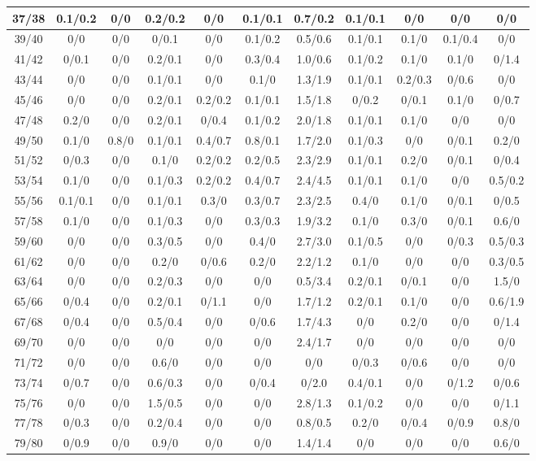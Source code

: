 \begin{table*}[htb]
\begin{tabular}{|c| c c c c c c c c c c |}
37/38&0.1/0.2& 0/0& 0.2/0.2& 0/0& 0.1/0.1& 0.7/0.2& 0.1/0.1& 0/0& 0/0& 0/0\\\hline
39/40&0/0& 0/0& 0/0.1& 0/0& 0.1/0.2& 0.5/0.6& 0.1/0.1& 0.1/0& 0.1/0.4& 0/0\\\hline
41/42&0/0.1& 0/0& 0.2/0.1& 0/0& 0.3/0.4& 1.0/0.6& 0.1/0.2& 0.1/0& 0.1/0& 0/1.4\\\hline
43/44&0/0& 0/0& 0.1/0.1& 0/0& 0.1/0& 1.3/1.9& 0.1/0.1& 0.2/0.3& 0/0.6& 0/0\\\hline
45/46&0/0& 0/0& 0.2/0.1& 0.2/0.2& 0.1/0.1& 1.5/1.8& 0/0.2& 0/0.1& 0.1/0& 0/0.7\\\hline
47/48&0.2/0& 0/0& 0.2/0.1& 0/0.4& 0.1/0.2& 2.0/1.8& 0.1/0.1& 0.1/0& 0/0& 0/0\\\hline
49/50&0.1/0& 0.8/0& 0.1/0.1& 0.4/0.7& 0.8/0.1& 1.7/2.0& 0.1/0.3& 0/0& 0/0.1& 0.2/0\\\hline
51/52&0/0.3& 0/0& 0.1/0& 0.2/0.2& 0.2/0.5& 2.3/2.9& 0.1/0.1& 0.2/0& 0/0.1& 0/0.4\\\hline
53/54&0.1/0& 0/0& 0.1/0.3& 0.2/0.2& 0.4/0.7& 2.4/4.5& 0.1/0.1& 0.1/0& 0/0& 0.5/0.2\\\hline
55/56&0.1/0.1& 0/0& 0.1/0.1& 0.3/0& 0.3/0.7& 2.3/2.5& 0.4/0& 0.1/0& 0/0.1& 0/0.5\\\hline
57/58&0.1/0& 0/0& 0.1/0.3& 0/0& 0.3/0.3& 1.9/3.2& 0.1/0& 0.3/0& 0/0.1& 0.6/0\\\hline
59/60&0/0& 0/0& 0.3/0.5& 0/0& 0.4/0& 2.7/3.0& 0.1/0.5& 0/0& 0/0.3& 0.5/0.3\\\hline
61/62&0/0& 0/0& 0.2/0& 0/0.6& 0.2/0& 2.2/1.2& 0.1/0& 0/0& 0/0& 0.3/0.5\\\hline
63/64&0/0& 0/0& 0.2/0.3& 0/0& 0/0& 0.5/3.4& 0.2/0.1& 0/0.1& 0/0& 1.5/0\\\hline
65/66&0/0.4& 0/0& 0.2/0.1& 0/1.1& 0/0& 1.7/1.2& 0.2/0.1& 0.1/0& 0/0& 0.6/1.9\\\hline
67/68&0/0.4& 0/0& 0.5/0.4& 0/0& 0/0.6& 1.7/4.3& 0/0& 0.2/0& 0/0& 0/1.4\\\hline
69/70&0/0& 0/0& 0/0& 0/0& 0/0& 2.4/1.7& 0/0& 0/0& 0/0& 0/0\\\hline
71/72&0/0& 0/0& 0.6/0& 0/0& 0/0& 0/0& 0/0.3& 0/0.6& 0/0& 0/0\\\hline
73/74&0/0.7& 0/0& 0.6/0.3& 0/0& 0/0.4& 0/2.0& 0.4/0.1& 0/0& 0/1.2& 0/0.6\\\hline
75/76&0/0& 0/0& 1.5/0.5& 0/0& 0/0& 2.8/1.3& 0.1/0.2& 0/0& 0/0& 0/1.1\\\hline
77/78&0/0.3& 0/0& 0.2/0.4& 0/0& 0/0& 0.8/0.5& 0.2/0& 0/0.4& 0/0.9& 0.8/0\\\hline
79/80&0/0.9& 0/0& 0.9/0& 0/0& 0/0& 1.4/1.4& 0/0& 0/0& 0/0& 0.6/0\\\hline

\end{tabular}
\end{table*}
